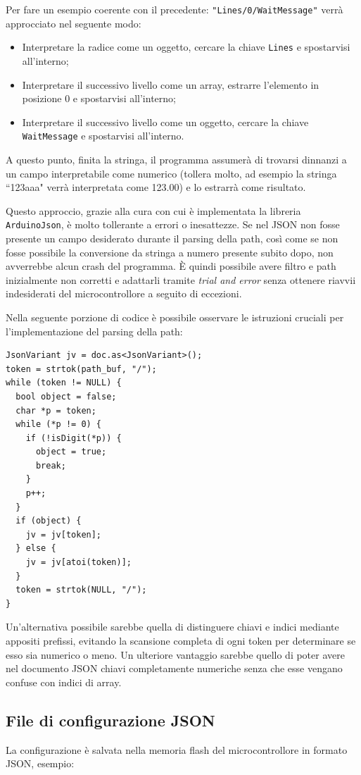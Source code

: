 \documentclass[12pt,a4paper]{report}
\begin{document}
Per fare un esempio coerente con il precedente: \texttt{"Lines/0/WaitMessage"} verrà approcciato nel seguente modo:
\begin{itemize}
  \item Interpretare la radice come un oggetto, cercare la chiave \texttt{Lines} e spostarvisi all'interno;
  \item Interpretare il successivo livello come un array, estrarre l'elemento in posizione 0 e spostarvisi all'interno;
  \item Interpretare il successivo livello come un oggetto, cercare la chiave \texttt{WaitMessage} e spostarvisi all'interno.
\end{itemize}
A questo punto, finita la stringa, il programma assumerà di trovarsi dinnanzi a un campo interpretabile come numerico (tollera molto,
ad esempio la stringa ``123aaa" verrà interpretata come 123.00) e lo estrarrà come risultato. %

Questo approccio, grazie alla cura con cui è implementata la libreria \texttt{ArduinoJson}, è molto tollerante a errori o inesattezze.
Se nel JSON non fosse presente un campo desiderato durante il parsing della path, così come se non fosse possibile la conversione
da stringa a numero presente subito dopo, non avverrebbe alcun crash del programma.
È quindi possibile avere filtro e path inizialmente non corretti e adattarli tramite \textit{trial and error} senza ottenere riavvii
indesiderati del microcontrollore a seguito di eccezioni.

Nella seguente porzione di codice è possibile osservare le istruzioni cruciali per l'implementazione del parsing della path:
\begin{lstlisting}
JsonVariant jv = doc.as<JsonVariant>();
token = strtok(path_buf, "/");
while (token != NULL) {
  bool object = false;
  char *p = token;
  while (*p != 0) {
    if (!isDigit(*p)) {
      object = true;
      break;
    }
    p++;
  }
  if (object) {
    jv = jv[token];
  } else {
    jv = jv[atoi(token)];
  }
  token = strtok(NULL, "/");
}
\end{lstlisting}
Un'alternativa possibile sarebbe quella di distinguere chiavi e indici mediante appositi prefissi, evitando la scansione completa di ogni
token per determinare se esso sia numerico o meno. Un ulteriore vantaggio sarebbe quello di poter avere nel documento JSON
chiavi completamente numeriche senza che esse vengano confuse con indici di array.

\subsection{File di configurazione JSON}
La configurazione è salvata nella memoria flash del microcontrollore
in formato JSON, esempio:
\end{document}
